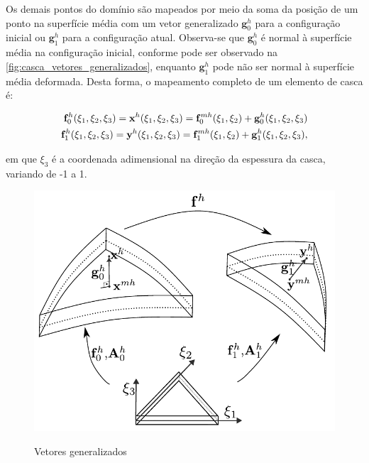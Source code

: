 Os demais pontos do domínio são mapeados por meio da soma da posição de um ponto na superfície média com um vetor generalizado $\mathbf{g}^{h}_{0}$ para a configuração inicial ou $\mathbf{g}^{h}_{1}$ para a configuração atual. Observa-se que $\mathbf{g}^{h}_{0}$ é normal à superfície média na configuração inicial, conforme pode ser observado na \autoref{fig:casca_vetores_generalizados}, enquanto $\mathbf{g}^{h}_{1}$ pode não ser normal à superfície média deformada. Desta forma, o mapeamento completo de um elemento de casca é:

\begin{align}
	\mathbf{f}^{h}_{0}(\xi_{1},\xi_{2},\xi_{3}) = \mathbf{x}^{h}(\xi_{1},\xi_{2},\xi_{3}) = \mathbf{f}^{mh}_{0}(\xi_{1},\xi_{2}) + \mathbf{g}^{h}_{0} (\xi_{1},\xi_{2}, \xi_{3}) \label{eq:fmap0}\\
	\mathbf{f}^{h}_{1}(\xi_{1},\xi_{2},\xi_{3}) = \mathbf{y}^{h}(\xi_{1},\xi_{2},\xi_{3}) = \mathbf{f}^{mh}_{1}(\xi_{1},\xi_{2}) + \mathbf{g}^{h}_{1} (\xi_{1},\xi_{2}, \xi_{3}),  \label{eq:fmap1}
\end{align}

\noindent em que $\xi_3$ é a coordenada adimensional na direção da espessura da casca, variando de -1 a 1.

\begin{figure}[!htbp]
	\caption{Vetores generalizados}
	\centering
	\includegraphics[scale=0.8,trim=0cm 0.0cm 0cm 0cm, clip=true]{Imagens/Cap4/casca_vetores_generalizados.pdf}	
	\label{fig:casca_vetores_generalizados}
\end{figure}

